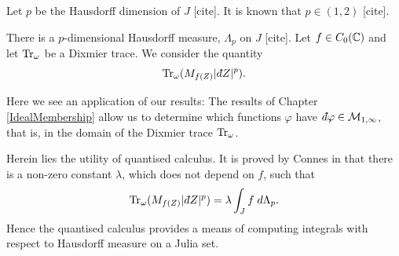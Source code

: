 Let $p$ be the Hausdorff dimension of $J$ [cite]. It is known that $p \in (1,2)$ [cite].

There is a $p$-dimensional Hausdorff measure, $\Lambda_p$ on $J$ [cite].
Let
$f\in C_0(\mathbb{C})$ and let $\operatorname{Tr}_\omega$
be a Dixmier trace. We consider the quantity
\begin{equation}
    \Tr_\omega(M_{f(Z)}|\qd Z|^p).
\end{equation}


Here we see an application of our results: The results of Chapter \ref{IdealMembership}
allow us to determine which functions $\varphi$ have $\qd \varphi\in \M_{1,\infty}$,
that is, in the domain of the Dixmier trace $\operatorname{Tr}_\omega$.

Herein lies the utility
of quantised calculus.
It is proved by Connes in \cite[Ch. 4, Thm 17]{Connes94} that there is a non-zero constant $\lambda$,
which does not depend on $f$, such that
\begin{equation}
    \Tr_\omega(M_{f(Z)}|\qd Z|^p) = \lambda \int_J f\;d\Lambda_p.
\end{equation}
Hence the quantised calculus provides a means of computing integrals
with respect to Hausdorff measure on a Julia set.
